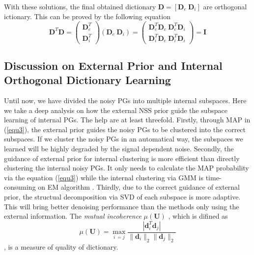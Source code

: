 \documentclass[10pt,twocolumn,letterpaper]{article}
\begin{document}
With these solutions, the final obtained dictionary $\mathbf{D} = [\mathbf{D}_{e}\ \mathbf{D}_{i}]$ are orthogonal ictionary. This can be proved by the following equation
\begin{equation}\label{equ8}
\mathbf{D}^{T}\mathbf{D} = 
\left(\begin{array}{c}
\mathbf{D}_{e}^{T}
\\
\mathbf{D}_{i}^{T}
\end{array}\right)
(\mathbf{D}_{e}\ \mathbf{D}_{i})
=
\left(\begin{array}{cc}
\mathbf{D}_{e}^{T}\mathbf{D}_{e}\ \mathbf{D}_{e}^{T}\mathbf{D}_{i}
\\
\mathbf{D}_{i}^{T}\mathbf{D}_{e}\ \mathbf{D}_{i}^{T}\mathbf{D}_{i}
\end{array}\right)
=
\mathbf{I}
\end{equation}

\subsection{Discussion on External Prior and Internal Orthogonal Dictionary Learning}
Until now, we have divided the noisy PGs into multiple internal subspaces. Here we take a deep analysis on how the external NSS prior guide the subspace learning of internal PGs. The help are at least threefold. Firstly, through MAP in (\ref{equ3}), the external prior guides the noisy PGs to be clustered into the correct subspaces. If we cluster the noisy PGs in an automatical way, the subspaces we learned will be highly degraded by the signal dependent noise. Secondly, the guidance of external prior for internal clustering is more efficient than directly clustering the internal noisy PGs. It only needs to calculate the MAP probability via the equation (\ref{equ3}) while the internal clustering via GMM is time-consuming on EM algorithm \cite{em}. Thirdly, due to the correct guidance of external prior, the structual decomposition via SVD of each subspace is more adaptive. This will bring better denoising performance than the methods only using the external information. The \emph{mutual incoherence} $\mu(\mathbf{U})$ \cite{donoho2003optimally}, which is difined as
\begin{equation}\label{equ9}
\mu(\mathbf{U})=\max_{i~=j}\frac{|\mathbf{d}_{i}^{T}\mathbf{d}_{j}|}{\|\mathbf{d}_{i}\|_{2}\|\mathbf{d}_{j}\|_{2}}
\end{equation},
is a measure of quality of dictionary.
\end{document}
